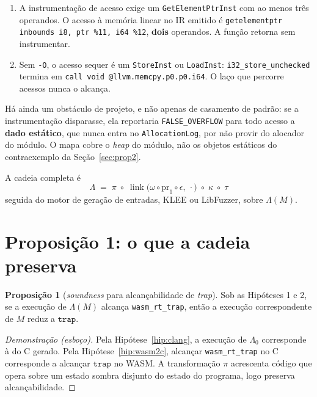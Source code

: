 \documentclass[11pt,a4paper]{article}
\theoremstyle{definition}
\newtheorem{proposicao}{Proposição}
\newcommand{\code}[1]{\texttt{#1}}
\begin{document}
\begin{enumerate}[leftmargin=1.6em]
  \item A instrumentação de acesso exige um \code{GetElementPtrInst} com ao menos
        três operandos. O acesso à memória linear no IR emitido é
        \code{getelementptr inbounds i8, ptr \%11, i64 \%12}, \textbf{dois}
        operandos. A função retorna sem instrumentar.
  \item Sem \code{-O}, o acesso sequer é um \code{StoreInst} ou \code{LoadInst}:
        \code{i32\_store\_unchecked} termina em
        \code{call void @llvm.memcpy.p0.p0.i64}. O laço que percorre acessos
        nunca o alcança.
\end{enumerate}

Há ainda um obstáculo de projeto, e não apenas de casamento de padrão: se a
instrumentação disparasse, ela reportaria \code{FALSE\_OVERFLOW} para todo acesso
a \textbf{dado estático}, que nunca entra no \code{AllocationLog}, por não
provir do alocador do módulo. O mapa cobre o \emph{heap} do módulo, não os
objetos estáticos do contraexemplo da Seção~\ref{sec:prop2}.

A cadeia completa é
\[
  \boxed{\;
  \Lambda \;=\; \pi \;\circ\;
  \operatorname{link}\bigl(\omega \circ \mathrm{pr}_1 \circ \epsilon,\ \cdot\bigr)
  \;\circ\; \kappa \;\circ\; \tau
  \;}
\]
seguida do motor de geração de entradas, KLEE ou LibFuzzer, sobre
$\Lambda(M)$.

\section{Proposição 1: o que a cadeia preserva}

\begin{proposicao}[\emph{soundness} para alcançabilidade de \emph{trap}]
\label{prop:sound}
Sob as Hipóteses 1 e 2, se a execução de $\Lambda(M)$ alcança
\code{wasm\_rt\_trap}, então a execução correspondente de $M$ reduz a
$\mathtt{trap}$.
\end{proposicao}

\begin{proof}[Demonstração (esboço)]
Pela Hipótese~\ref{hip:clang}, a execução de $\Lambda_0$ corresponde à do C
gerado. Pela Hipótese~\ref{hip:wasm2c}, alcançar \code{wasm\_rt\_trap} no C
corresponde a alcançar $\mathtt{trap}$ no WASM. A transformação $\pi$ acrescenta
código que opera sobre um estado sombra disjunto do estado do programa, logo
preserva alcançabilidade.
\end{proof}
\end{document}
